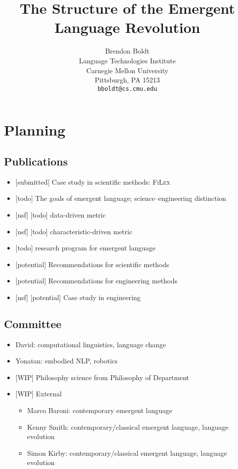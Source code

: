 \documentclass[letterpaper]{report}
\title{The Structure of the Emergent Language Revolution}
\author{%
  Brendon Boldt\\
  Language Technologies Institute\\
  Carnegie Mellon University\\
  Pittsburgh, PA 15213 \\
  \texttt{bboldt@cs.cmu.edu} \\
}
\newcommand\cmg[1]{{\color{gray}[#1]}}
\begin{document}
\maketitle

\tableofcontents

\setcounter{chapter}{-1}
\chapter{Planning}

\section{Publications}
\begin{itemize}
    \item{} \cmg{submitted} Case study in scientific methods: \textsc{FiLex}
    \item{} \cmg{todo} The goals of emergent language; science--engineering distinction
    \item{} \cmg{nsf} \cmg{todo} data-driven metric
    \item{} \cmg{nsf} \cmg{todo} characteristic-driven metric
    \item{} \cmg{todo} research program for emergent language
    \item{} \cmg{potential} Recommendations for scientific methods
    \item{} \cmg{potential} Recommendations for engineering methods
    \item{} \cmg{nsf} \cmg{potential} Case study in engineering
\end{itemize}

\section{Committee}
\begin{itemize}
    \item David: computational linguistics, language change
    \item Yonatan: embodied NLP, robotics
    \item \cmg{WIP} Philosophy science from Philosophy of Department
    \item \cmg{WIP} External
        \begin{itemize}
        \item Marco Baroni: contemporary emergent language
        \item Kenny Smith: contemporary/classical emergent language, language evolution
        \item Simon Kirby: contemporary/classical emergent language, language evolution
        \end{itemize}

\end{itemize}
\end{document}
